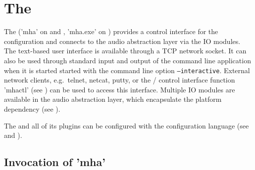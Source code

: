 

\section{The \mhad{}}\label{sec:linuxmhaserver}\label{sec:frameworks}

The \mhad{} ('mha' on \Linux{} and \macOS{}, 'mha.exe' on \Windows{})
provides a control interface for the configuration and connects to the audio
abstraction layer via the \mhad{} IO modules.
%
The text-based user interface is available through a TCP network
socket. It can also be used through standard input and output of the
\mhad command line application when it is started started with the
command line option \texttt{--interactive}.
%
External network clients, e.g.\ telnet, netcat, putty, or the \Octave{}/\Matlab{} control
interface function 'mhactl' (see ) can be used
to access this interface.
%
Multiple IO modules are available in the audio abstraction layer,
which encapsulate the platform dependency (see
).
%

The \mhad{} and all of its plugins can be configured with the \mha{}
configuration language (see  and ).
%


\subsection{Invocation of 'mha'}

